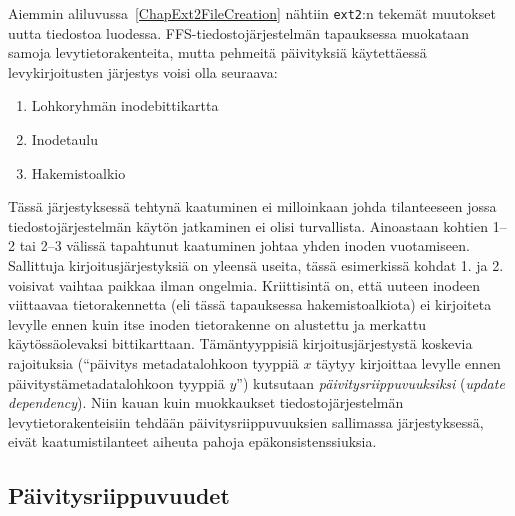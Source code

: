 Aiemmin aliluvussa~\ref{ChapExt2FileCreation} nähtiin \texttt{ext2}:n tekemät muutokset uutta tiedostoa luodessa.
FFS-tiedostojärjestelmän tapauksessa muokataan samoja levytietorakenteita,
mutta pehmeitä päivityksiä käytettäessä levykirjoitusten järjestys voisi olla seuraava:
\begin{enumerate}
    \item{Lohkoryhmän inodebittikartta}
    \item{Inodetaulu}
    \item{Hakemistoalkio}
\end{enumerate}

Tässä järjestyksessä tehtynä kaatuminen ei milloinkaan johda tilanteeseen jossa tiedostojärjestelmän käytön jatkaminen ei olisi turvallista.
Ainoastaan kohtien 1--2 tai 2--3 välissä tapahtunut kaatuminen johtaa yhden inoden vuotamiseen.
Sallittuja kirjoitusjärjestyksiä on yleensä useita, tässä esimerkissä kohdat 1. ja 2. voisivat vaihtaa paikkaa ilman ongelmia.
Kriittisintä on, että uuteen inodeen viittaavaa tietorakennetta (eli tässä tapauksessa hakemistoalkiota) ei kirjoiteta levylle ennen kuin itse inoden tietorakenne on alustettu ja merkattu käytössäolevaksi bittikarttaan.
Tämäntyyppisiä kirjoitusjärjestystä koskevia rajoituksia (``päivitys metadatalohkoon tyyppiä $x$ täytyy kirjoittaa levylle ennen päivitystämetadatalohkoon tyyppiä $y$'') kutsutaan \emph{päivitysriippuvuuksiksi} (\emph{update dependency}).
Niin kauan kuin muokkaukset tiedostojärjestelmän levytietorakenteisiin tehdään päivitysriippuvuuksien sallimassa järjestyksessä,
eivät kaatumistilanteet aiheuta pahoja epäkonsistenssiuksia.

\subsection{Päivitysriippuvuudet}


